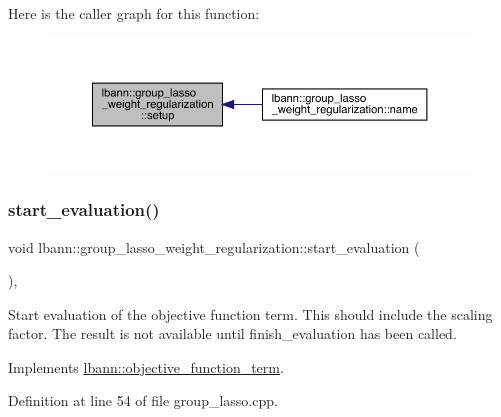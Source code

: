 Here is the caller graph for this function\+:\nopagebreak
\begin{figure}[H]
\begin{center}
\leavevmode
\includegraphics[width=350pt]{classlbann_1_1group__lasso__weight__regularization_af413161b1feefa3bb472079635547c57_icgraph}
\end{center}
\end{figure}
\mbox{\label{classlbann_1_1group__lasso__weight__regularization_a5cc5fd80eed7f2b9d881c48edc6d49d0}} 
\subsubsection{\texorpdfstring{start\+\_\+evaluation()}{start\_evaluation()}}
{\footnotesize\ttfamily void lbann\+::group\+\_\+lasso\+\_\+weight\+\_\+regularization\+::start\+\_\+evaluation (\begin{DoxyParamCaption}{ }\end{DoxyParamCaption})\hspace{0.3cm}{\ttfamily [override]}, {\ttfamily [virtual]}}

Start evaluation of the objective function term. This should include the scaling factor. The result is not available until finish\+\_\+evaluation has been called. 

Implements \hyperlink{classlbann_1_1objective__function__term_a0af4dfd71fb30e43d1ae7611172ad9b0}{lbann\+::objective\+\_\+function\+\_\+term}.



Definition at line 54 of file group\+\_\+lasso.\+cpp.


